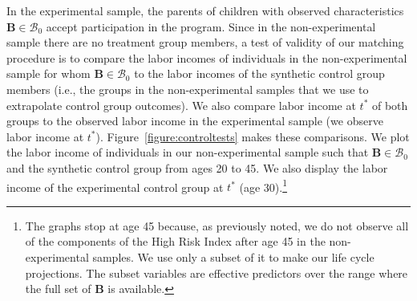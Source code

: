 \begin{figure}
\end{figure}

In the experimental sample, the parents of children with observed characteristics $\bm{B} \in \mathcal{B}_0$ accept participation in the program. Since in the non-experimental sample there are no treatment group members, a test of validity of our matching procedure is to compare the labor incomes of individuals in the non-experimental sample for whom $\bm{B} \in \mathcal{B}_0$ to the labor incomes of the synthetic control group members (i.e., the groups in the non-experimental samples that we use to extrapolate control group outcomes). We also compare labor income at $t^*$ of both groups to the observed labor income in the experimental sample (we observe labor income at $t^*$). Figure~\ref{figure:controltests} makes these comparisons. We plot the labor income of individuals in our non-experimental sample such that $\bm{B} \in \mathcal{B}_0$ and the synthetic control group from ages 20 to 45. We also display the labor income of the experimental control group at $t^*$ (age 30).\footnote{The graphs stop at age 45 because, as previously noted, we do not observe all of the components of the High Risk Index after age 45 in the non-experimental samples. We use only a subset of it to make our life cycle projections. The subset variables are effective predictors over the range where the full set of $\bm{B}$ is available.}

